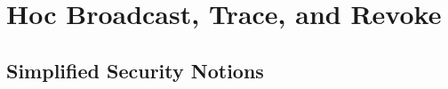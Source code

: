 \section{\Ad Hoc Broadcast, Trace, and Revoke}\label{sec:ahbtr-definitions}







\subsection{Simplified Security Notions}\label{sec:ahbtr-simplified-security}










